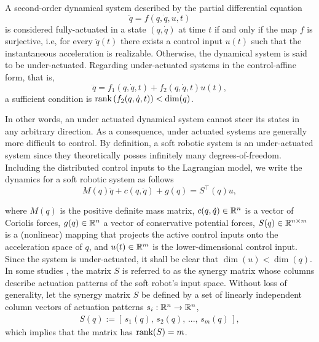 \begin{definition}
A second-order dynamical system described by the partial differential equation
\begin{equation}
\ddot{q} = f(q,\dot{q},u,t)
\end{equation}
is considered fully-actuated in a state $(q,\dot{q})$ at time $t$ if and only if the map $f$ is surjective, i.e, for every $\ddot{q}(t)$ there exists a control input $u(t)$ such that the instantaneous acceleration is realizable. Otherwise, the dynamical system is said to be under-actuated. Regarding under-actuated systems in the control-affine form, that is,
\begin{equation}
\ddot{q} = f_1(q,\dot{q},t) + f_2(q,\dot{q},t)u(t),
\end{equation}
a sufficient condition is $\textnormal{rank} \left(f_2(q,\dot{q},t)\right) < \dim(q)$.
\end{definition}

\noindent In other words, an under actuated dynamical system cannot steer its states in any arbitrary direction. As a consequence, under actuated systems are generally more difficult to control. By definition, a soft robotic system is an under-actuated system since they theoretically posses infinitely many degrees-of-freedom. Including the distributed control inputs to the Lagrangian model, we write the dynamics for a soft robotic system as follows
\begin{equation}
M(q)\ddot{q} + c(q,\dot{q}) + g(q)= S^\top(q) u,
\end{equation}

\noindent where $M(q)$ is the positive definite mass matrix, $c(q,\dot{q})\in \mathbb{R}^{n}$ is a vector of Coriolis forces, $g(q)\in \mathbb{R}^{n}$ a vector of conservative potential forces, $S(q) \in \mathbb{R}^{n\times m}$ is a (nonlinear) mapping that projects the active control inputs onto the acceleration space of ${q}$, and $u(t) \in \mathbb{R}^{m}$ is the lower-dimensional control input. Since the system is under-actuated, it shall be clear that $\dim(u) < \dim(q)$. In some studies \cite{Santina2019}, the matrix $S$ is referred to as the synergy matrix whose columns describe actuation patterns of the soft robot's input space. Without loss of generality, let the synergy matrix $S$ be defined by a set of linearly independent column vectors of actuation patterns $s_i: \mathbb{R}^n \to \mathbb{R}^n$,
\begin{align}
S(q) := \left[\,s_1(q),\,s_2(q),\,...,\,s_m(q)\,\right], 
\end{align}
which implies that the matrix has $\textnormal{rank}(S) = m$. 


